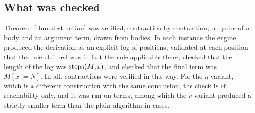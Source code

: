 \begin{center}
\tableAbs
\end{center}

\subsection{What was checked}

Theorem~\ref{thm:abstraction} was verified, contraction by contraction, on \factAbsCases{} pairs of a body and an argument term, drawn from \factAbsTerms{} bodies. In each instance the engine produced the derivation as an explicit log of positions, validated at each position that the rule claimed was in fact the rule applicable there, checked that the length of the log was $\mathrm{steps}(M,x)$, and checked that the final term was $M[x:=N]$. In all, \factAbsSteps{} contractions were verified in this way. For the $\eta$ variant, which is a different construction with the same conclusion, the check is of reachability only, and it was run on \factEtaChecked{} terms, among which the $\eta$ variant produced a strictly smaller term than the plain algorithm in \factEtaSmaller{} cases.
